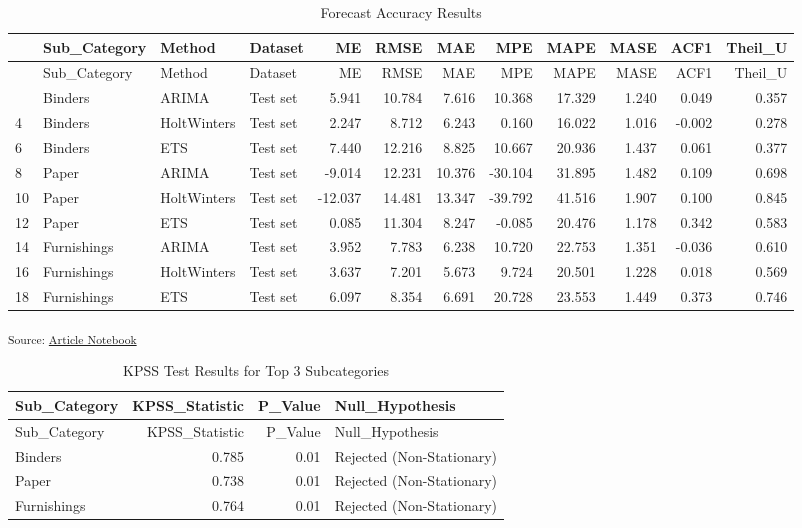 \documentclass[
  letterpaper,
  DIV=11,
  numbers=noendperiod]{scrartcl}
\begin{document}
\begin{longtable}[]{@{}llllrrrrrrrr@{}}
\caption{Forecast Accuracy Results}\tabularnewline
\toprule\noalign{}
& Sub\_Category & Method & Dataset & ME & RMSE & MAE & MPE & MAPE & MASE
& ACF1 & Theil\_U \\
\midrule\noalign{}
\endfirsthead
\toprule\noalign{}
& Sub\_Category & Method & Dataset & ME & RMSE & MAE & MPE & MAPE & MASE
& ACF1 & Theil\_U \\
\midrule\noalign{}
\endhead
\bottomrule\noalign{}
\endlastfoot
2 & Binders & ARIMA & Test set & 5.941 & 10.784 & 7.616 & 10.368 &
17.329 & 1.240 & 0.049 & 0.357 \\
4 & Binders & HoltWinters & Test set & 2.247 & 8.712 & 6.243 & 0.160 &
16.022 & 1.016 & -0.002 & 0.278 \\
6 & Binders & ETS & Test set & 7.440 & 12.216 & 8.825 & 10.667 & 20.936
& 1.437 & 0.061 & 0.377 \\
8 & Paper & ARIMA & Test set & -9.014 & 12.231 & 10.376 & -30.104 &
31.895 & 1.482 & 0.109 & 0.698 \\
10 & Paper & HoltWinters & Test set & -12.037 & 14.481 & 13.347 &
-39.792 & 41.516 & 1.907 & 0.100 & 0.845 \\
12 & Paper & ETS & Test set & 0.085 & 11.304 & 8.247 & -0.085 & 20.476 &
1.178 & 0.342 & 0.583 \\
14 & Furnishings & ARIMA & Test set & 3.952 & 7.783 & 6.238 & 10.720 &
22.753 & 1.351 & -0.036 & 0.610 \\
16 & Furnishings & HoltWinters & Test set & 3.637 & 7.201 & 5.673 &
9.724 & 20.501 & 1.228 & 0.018 & 0.569 \\
18 & Furnishings & ETS & Test set & 6.097 & 8.354 & 6.691 & 20.728 &
23.553 & 1.449 & 0.373 & 0.746 \\
\end{longtable}

\textsubscript{Source:
\href{https://SJbrou.github.io/Supply_Chain_Data_Analysis/index.qmd.html}{Article
Notebook}}

\begin{longtable}[]{@{}lrrl@{}}
\caption{KPSS Test Results for Top 3 Subcategories}\tabularnewline
\toprule\noalign{}
Sub\_Category & KPSS\_Statistic & P\_Value & Null\_Hypothesis \\
\midrule\noalign{}
\endfirsthead
\toprule\noalign{}
Sub\_Category & KPSS\_Statistic & P\_Value & Null\_Hypothesis \\
\midrule\noalign{}
\endhead
\bottomrule\noalign{}
\endlastfoot
Binders & 0.785 & 0.01 & Rejected (Non-Stationary) \\
Paper & 0.738 & 0.01 & Rejected (Non-Stationary) \\
Furnishings & 0.764 & 0.01 & Rejected (Non-Stationary) \\
\end{longtable}
\end{document}
